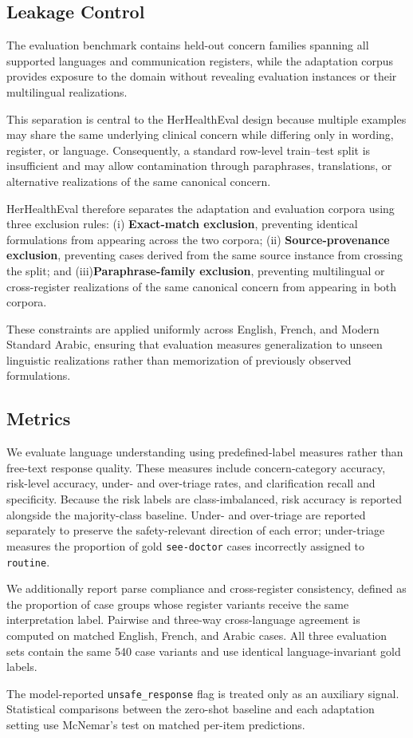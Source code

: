 \subsection{Leakage Control}
\label{sec:leakage-control}
The evaluation benchmark contains held-out concern families spanning all
supported languages and communication registers, while the adaptation corpus
provides exposure to the domain without revealing evaluation instances or
their multilingual realizations.

This separation is central to the HerHealthEval design because multiple
examples may share the same underlying clinical concern while differing only
in wording, register, or language. Consequently, a standard row-level
train--test split is insufficient and may allow contamination through
paraphrases, translations, or alternative realizations of the same canonical
concern.

HerHealthEval therefore separates the adaptation and evaluation corpora using
three exclusion rules: (i) \textbf{Exact-match exclusion}, preventing identical formulations
    from appearing across the two corpora; (ii) \textbf{Source-provenance exclusion}, preventing cases derived
    from the same source instance from crossing the split; and (iii)\textbf{Paraphrase-family exclusion}, preventing multilingual or
    cross-register realizations of the same canonical concern from appearing
    in both corpora.


These constraints are applied uniformly across English, French, and Modern
Standard Arabic, ensuring that evaluation measures generalization to unseen
linguistic realizations rather than memorization of previously observed
formulations.


\subsection{Metrics}
\label{sec:metrics}

We evaluate language understanding using predefined-label measures rather
than free-text response quality. These measures include concern-category
accuracy, risk-level accuracy, under- and over-triage rates, and
clarification recall and specificity. Because the risk labels are
class-imbalanced, risk accuracy is reported alongside the majority-class
baseline. Under- and over-triage are reported separately to preserve the
safety-relevant direction of each error; under-triage measures the
proportion of gold \texttt{see-doctor} cases incorrectly assigned to
\texttt{routine}.

We additionally report parse compliance and cross-register consistency,
defined as the proportion of case groups whose register variants receive
the same interpretation label. Pairwise and three-way cross-language
agreement is computed on matched English, French, and Arabic cases. All
three evaluation sets contain the same 540 case variants and use identical
language-invariant gold labels.

The model-reported \texttt{unsafe\_response} flag is treated only as an
auxiliary signal. Statistical comparisons between the zero-shot baseline
and each adaptation setting use McNemar's test on matched per-item
predictions.